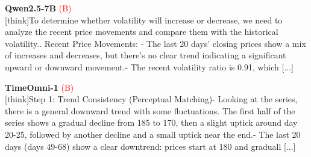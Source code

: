 \noindent
\begin{minipage}[t]{0.28\textwidth}
\colorbox{red!8}{\parbox{\dimexpr\textwidth-2\fboxsep}{
\textbf{Qwen2.5-7B} \textcolor{red}{(B)} \\[2pt]
\tiny
[think]\newline To determine whether volatility will increase or decrease, we need to analyze the recent price movements and compare them with the historical volatility.. Recent Price Movements: \newline    - The last 20 days' closing prices show a mix of increases and decreases, but there's no clear trend indicating a significant upward or downward movement.\newline    - The recent volatility ratio is 0.91, which  [...]
}}
\end{minipage}
\hfill
\begin{minipage}[t]{0.28\textwidth}
\colorbox{red!8}{\parbox{\dimexpr\textwidth-2\fboxsep}{
\textbf{TimeOmni-1} \textcolor{red}{(B)} \\[2pt]
\tiny
[think]\newline Step 1: Trend Consistency (Perceptual Matching)\newline - Looking at the series, there is a general downward trend with some fluctuations. The first half of the series shows a gradual decline from  185 to  170, then a slight uptick around day 20-25, followed by another decline and a small uptick near the end.\newline - The last 20 days (days 49-68) show a clear downtrend: prices start at  180 and graduall [...]
}}
\end{minipage}
\hfill
